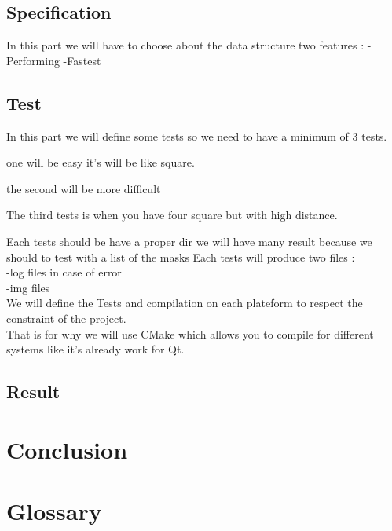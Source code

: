 \documentclass[a4paper,11pt]{report}
\begin{document}




\section{Specification}

In this part we will have to choose about the data structure two features :
	-Performing
	-Fastest


\section{Test}

In this part we will define some tests so we need to have a minimum of 3 tests.

one will be easy it's will be like square. %

the second will be more difficult %

The third tests is when you have four square but with high distance. %

Each tests should be have a proper dir we will have many result because we should to test with a list of the masks
Each tests will produce two files : \\
	-log files in case of error \\
	-img files \\

We will define the Tests and compilation on each plateform to respect the constraint of the project. \\
That is for why we will use CMake which allows you to compile for different systems like it's already work for Qt. \\


\section{Result}
\chapter{Conclusion}
\chapter{Glossary}
\end{document}
